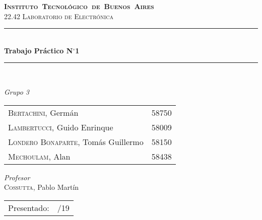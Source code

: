 \begin{titlepage}
\newcommand{\HRule}{\rule{\linewidth}{0.5mm}}
\center
\mbox{\textsc{\LARGE \bfseries {Instituto Tecnológico de Buenos Aires}}}\\[1.5cm]
\textsc{\Large 22.42 Laboratorio de Electrónica}\\[0.5cm]


\HRule \\[0.6cm]
{ \Huge \bfseries Trabajo Práctico N$^{\circ}$1}\\[0.4cm] 
\HRule \\[1.5cm]


{\large

\emph{Grupo 3}\\
\vspace{3px}

\begin{tabular}{lr} 	
\textsc{Bertachini}, Germán  & 58750 \\ 	
\textsc{Lambertucci}, Guido Enrinque  & 58009 \\
\textsc{Londero Bonaparte}, Tomás Guillermo  & 58150 \\
\textsc{Mechoulam}, Alan  &  58438\\
\end{tabular}

\vspace{20px}

\emph{Profesor}\\
\vspace{3px}
\textsc{Cossutta}, Pablo Martín\\	

\vspace{100px}

\begin{tabular}{ll}

Presentado: & /19\\

\end{tabular}

}

\vfill

\end{titlepage}
